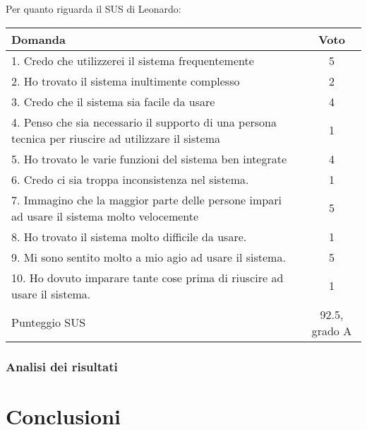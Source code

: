 \documentclass[../Report.tex]{subfiles}
\begin{document}
    Per quanto riguarda il SUS di Leonardo:
    \begin{table}[H]
        \begin{tabular}{|p{10cm}|c|}
            \hline
            \textbf{Domanda} & \textbf{Voto}\\
            \hline
            1. \cellcolor{green} Credo che utilizzerei il sistema frequentemente & 5\\
            \hline
            2. \cellcolor{red} Ho trovato il sistema inultimente complesso & 2 \\
            \hline
            3. \cellcolor{green} Credo che il sistema sia facile da usare & 4 \\
            \hline
            4. \cellcolor{red} Penso che sia necessario il supporto di una persona tecnica per riuscire ad utilizzare il sistema & 1 \\
            \hline
            5. \cellcolor{green} Ho trovato le varie funzioni del sistema ben integrate & 4 \\
            \hline
            6. \cellcolor{red} Credo ci sia troppa inconsistenza nel sistema. & 1\\
            \hline
            7. \cellcolor{green} Immagino che la maggior parte delle persone impari ad usare il sistema molto velocemente & 5 \\
            \hline
            8. \cellcolor{red} Ho trovato il sistema molto difficile da usare. & 1 \\
            \hline
            9. \cellcolor{green} Mi sono sentito molto a mio agio ad usare il sistema. & 5\\
            \hline
            10. \cellcolor{red} Ho dovuto imparare tante cose prima di riuscire ad usare il sistema. & 1 \\ 
            \hline
            Punteggio SUS & 92.5, grado A \\
            \hline
        \end{tabular}
    \end{table}
    \subsection{Analisi dei risultati}

    \chapter{Conclusioni}
\end{document}
